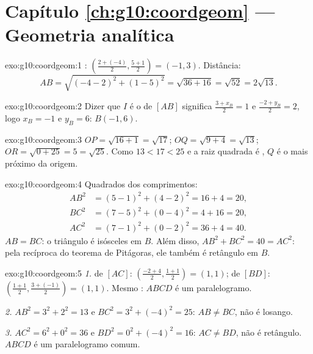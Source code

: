 \section*{Capítulo \ref{ch:g10:coordgeom} --- Geometria analítica}

\begin{solution}{exo:g10:coordgeom:1}
: $\left(\frac{2 + (-4)}{2}, \frac{5 + 1}{2}\right) = (-1,
3)$. Distância:
\[
AB = \sqrt{(-4 - 2)^2 + (1 - 5)^2} = \sqrt{36 + 16} = \sqrt{52}
= 2\sqrt{13}.
\]
\end{solution}

\begin{solution}{exo:g10:coordgeom:2}
Dizer que $I$ é o  de $[AB]$ significa $\frac{3 + x_B}{2} = 1$
e $\frac{-2 + y_B}{2} = 2$, logo $x_B = -1$ e $y_B = 6$: $B(-1, 6)$.
\end{solution}

\begin{solution}{exo:g10:coordgeom:3}
$OP = \sqrt{16 + 1} = \sqrt{17}$; $OQ = \sqrt{9 + 4} = \sqrt{13}$;
$OR = \sqrt{0 + 25} = 5 = \sqrt{25}$. Como $13 < 17 < 25$ e a raiz
quadrada é , $Q$ é o mais próximo da origem.
\end{solution}

\begin{solution}{exo:g10:coordgeom:4}
Quadrados dos comprimentos:
\begin{align*}
AB^2 &= (5-1)^2 + (4-2)^2 = 16 + 4 = 20, \\
BC^2 &= (7-5)^2 + (0-4)^2 = 4 + 16 = 20, \\
AC^2 &= (7-1)^2 + (0-2)^2 = 36 + 4 = 40 .
\end{align*}
$AB = BC$: o triângulo é isósceles em $B$. Além disso,
$AB^2 + BC^2 = 40 = AC^2$: pela recíproca do teorema de Pitágoras, ele
também é retângulo em $B$.
\end{solution}

\begin{solution}{exo:g10:coordgeom:5}
\emph{1.}  de $[AC]$:
$\left(\frac{-2+4}{2}, \frac{1+1}{2}\right) = (1, 1)$;  de
$[BD]$: $\left(\frac{1+1}{2}, \frac{3+(-1)}{2}\right) = (1, 1)$. Mesmo
: $ABCD$ é um paralelogramo.

\emph{2.} $AB^2 = 3^2 + 2^2 = 13$ e $BC^2 = 3^2 + (-4)^2 = 25$:
$AB \neq BC$, não é losango.

\emph{3.} $AC^2 = 6^2 + 0^2 = 36$ e $BD^2 = 0^2 + (-4)^2 = 16$:
$AC \neq BD$, não é retângulo. $ABCD$ é um paralelogramo comum.
\end{solution}

